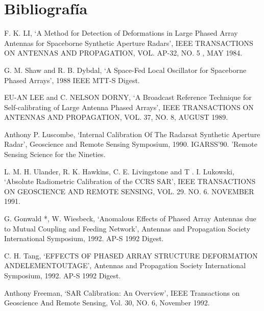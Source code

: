 \documentclass[a4paper,10pt]{article}
\begin{document}
	\newpage
	\section{Bibliografía}
	
	\begin{enumerate}[ {[}1{]} ]
		\item \label{ppr:aligment1} F. K. LI, \enquote*{A Method for Detection 
		of Deformations in Large Phased Array Antennas for Spaceborne Synthetic
		Aperture Radars}, IEEE TRANSACTIONS ON ANTENNAS AND PROPAGATION, VOL. 
		AP-32, NO. 5 , MAY 1984.
		
		\item \label{ppr:aligment2} G. M. Shaw and R. B. Dybdal, \enquote*{A 
		Space-Fed Local Oscillator for Spaceborne Phased Arrays}, 1988 IEEE 
		MTT-S Digest.

		\item \label{ppr:brdcast1} EU-AN LEE and C. NELSON DORNY, \enquote*{A 
		Broadcast Reference Technique for Self-calibrating of Large Antenna 
		Phased Arrays}, IEEE TRANSACTIONS ON ANTENNAS AND PROPAGATION, VOL. 37,
		NO. 8, AUGUST 1989.
		
		\item \label{ppr:classic1} Anthony P. Luscombe, \enquote*{Internal 
		Calibration Of The Radarsat Synthetic Aperture Radar}, Geoscience and 
		Remote Sensing Symposium, 1990. IGARSS'90. 'Remote Sensing Science for 
		the Nineties.
		
		\item \label{ppr:absRad1} L. M. H. Ulander, R. K. Hawkins, C. E.
		Livingstone and T . I. Lukowski, \enquote*{Absolute Radiometric 
		Calibration of the CCRS SAR}, IEEE TRANSACTIONS ON GEOSCIENCE AND REMOTE
		SENSING, VOL. 29. NO. 6. NOVEMBER 1991.
		
		\item G. Gonwald *, W. Wiesbeck, \enquote*{Anomalous Effects of Phased 
		Array Antennas due to Mutual Coupling and Feeding Network}, Antennas and
		Propagation Society International Symposium, 1992. AP-S 1992 Digest.
		
		\item C. H. Tang, \enquote*{EFFECTS OF PHASED ARRAY STRUCTURE
		DEFORMATION ANDELEMENTOUTAGE}, Antennas and Propagation Society 
		International Symposium, 1992. AP-S 1992 Digest.
		
		\item \label{ppr:puncTrgt1} Anthony Freeman, \enquote*{SAR Calibration: 
		An Overview}, IEEE Transactions on Geoscience And Remote Sensing, Vol. 
		30, NO. 6, November 1992.
		

\end{enumerate}
\end{document}
